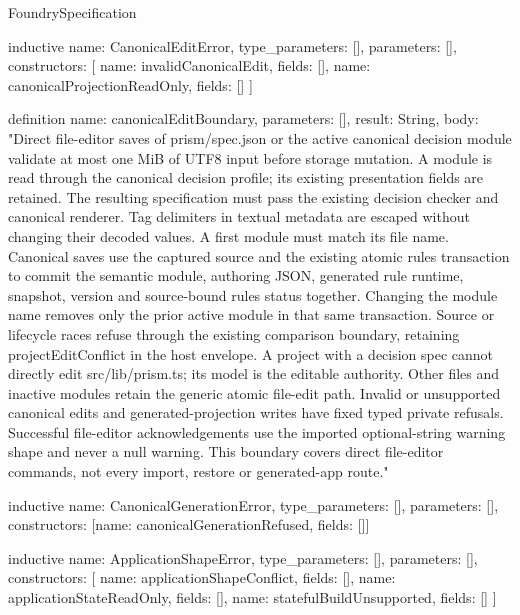 \begin{lexlean}{FoundrySpecification}
\begin{semanticmodule}
inductive{
  name: CanonicalEditError,
  type_parameters: [],
  parameters: [],
  constructors: [
    {name: invalidCanonicalEdit, fields: []},
    {name: canonicalProjectionReadOnly, fields: []}
  ]
}

definition{
  name: canonicalEditBoundary,
  parameters: [],
  result: String,
  body: "Direct file-editor saves of prism/spec.json or the active canonical decision module validate at most one MiB of UTF8 input before storage mutation. A module is read through the canonical decision profile; its existing presentation fields are retained. The resulting specification must pass the existing decision checker and canonical renderer. Tag delimiters in textual metadata are escaped without changing their decoded values. A first module must match its file name. Canonical saves use the captured source and the existing atomic rules transaction to commit the semantic module, authoring JSON, generated rule runtime, snapshot, version and source-bound rules status together. Changing the module name removes only the prior active module in that same transaction. Source or lifecycle races refuse through the existing comparison boundary, retaining projectEditConflict in the host envelope. A project with a decision spec cannot directly edit src/lib/prism.ts; its model is the editable authority. Other files and inactive modules retain the generic atomic file-edit path. Invalid or unsupported canonical edits and generated-projection writes have fixed typed private refusals. Successful file-editor acknowledgements use the imported optional-string warning shape and never a null warning. This boundary covers direct file-editor commands, not every import, restore or generated-app route."
}

inductive{
  name: CanonicalGenerationError,
  type_parameters: [],
  parameters: [],
  constructors: [{name: canonicalGenerationRefused, fields: []}]
}

inductive{
  name: ApplicationShapeError,
  type_parameters: [],
  parameters: [],
  constructors: [
    {name: applicationShapeConflict, fields: []},
    {name: applicationStateReadOnly, fields: []},
    {name: statefulBuildUnsupported, fields: []}
  ]
}


\end{semanticmodule}
\end{lexlean}
